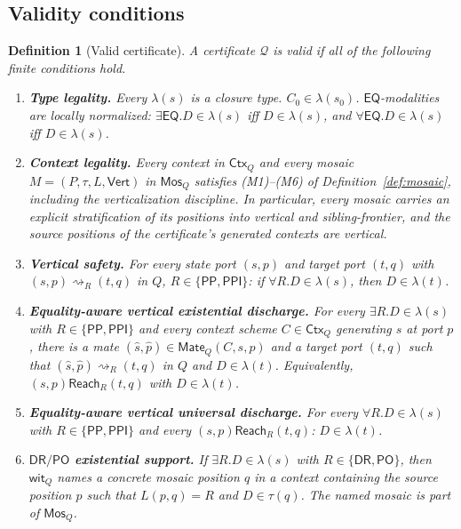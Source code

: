 \documentclass[11pt]{article}
\newtheorem{definition}[theorem]{Definition}
\newcommand{\EQ}{\mathsf{EQ}}
\newcommand{\DR}{\mathsf{DR}}
\newcommand{\PO}{\mathsf{PO}}
\newcommand{\PP}{\mathsf{PP}}
\newcommand{\PPI}{\mathsf{PPI}}
\newcommand{\Q}{\mathcal Q}
\newcommand{\Mos}{\mathsf{Mos}}
\newcommand{\Ctx}{\mathsf{Ctx}}
\newcommand{\Mate}{\mathsf{Mate}}
\newcommand{\reach}{\rightsquigarrow}
\newcommand{\Reach}{\mathrel{\mathsf{Reach}}}
\newcommand{\Vrt}{\mathsf{Vert}}
\begin{document}
\subsection{Validity conditions}

\begin{definition}[Valid certificate]\label{def:valid}
A certificate $\Q$ is valid if all of the following finite conditions hold.
\begin{enumerate}[label=(V\arabic*)]
\item \textbf{Type legality.}  Every $\lambda(s)$ is a closure type.  $C_0\in\lambda(s_0)$.  $\EQ$-modalities are locally normalized: $\exists\EQ.D\in\lambda(s)$ iff $D\in\lambda(s)$, and $\forall\EQ.D\in\lambda(s)$ iff $D\in\lambda(s)$.

\item \textbf{Context legality.}  Every context in $\Ctx_Q$ and every mosaic $M=(P,\tau,L,\Vrt)$ in $\Mos_Q$ satisfies (M1)--(M6) of Definition~\ref{def:mosaic}, including the verticalization discipline.  In particular, every mosaic carries an explicit stratification of its positions into vertical and sibling-frontier, and the source positions of the certificate's generated contexts are vertical.

\item \textbf{Vertical safety.}  For every state port $(s,p)$ and target port $(t,q)$ with $(s,p)\reach_R(t,q)$ in $Q$, $R\in\{\PP,\PPI\}$: if $\forall R.D\in\lambda(s)$, then $D\in\lambda(t)$.

\item \textbf{Equality-aware vertical existential discharge.}  For every $\exists R.D\in\lambda(s)$ with $R\in\{\PP,\PPI\}$ and every context scheme $C\in\Ctx_Q$ generating $s$ at port $p$, there is a mate $(\widehat s,\widehat p)\in\Mate_Q(C,s,p)$ and a target port $(t,q)$ such that $(\widehat s,\widehat p)\reach_R(t,q)$ in $Q$ and $D\in\lambda(t)$.  Equivalently, $(s,p)\Reach_R(t,q)$ with $D\in\lambda(t)$.

\item \textbf{Equality-aware vertical universal discharge.}  For every $\forall R.D\in\lambda(s)$ with $R\in\{\PP,\PPI\}$ and every $(s,p)\Reach_R(t,q)$: $D\in\lambda(t)$.

\item \textbf{$\DR/\PO$ existential support.}  If $\exists R.D\in\lambda(s)$ with $R\in\{\DR,\PO\}$, then $\mathsf{wit}_Q$ names a concrete mosaic position $q$ in a context containing the source position $p$ such that $L(p,q)=R$ and $D\in\tau(q)$.  The named mosaic is part of $\Mos_Q$.


\end{enumerate}
\end{definition}
\end{document}
